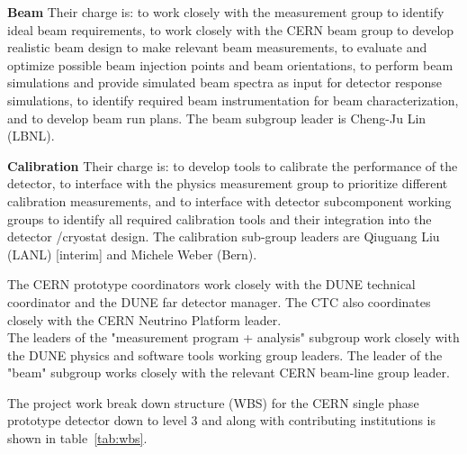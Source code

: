  
{\bf Beam} Their charge is: to work closely with the measurement group to identify ideal beam requirements, to work closely with the CERN beam group to develop realistic beam design to make relevant beam measurements, to evaluate and optimize possible beam injection points and beam orientations, to perform beam simulations and provide simulated beam spectra as input for detector response simulations, to identify required beam instrumentation for beam characterization, and to develop beam run plans.
The  beam subgroup leader is Cheng-Ju Lin (LBNL).


{\bf Calibration}  Their charge is:  to develop tools to calibrate the performance of the detector, to interface with the physics measurement group to prioritize different calibration measurements, and to interface with detector subcomponent working groups to identify all required calibration tools and their integration into the detector /cryostat design.
The calibration sub-group leaders are Qiuguang Liu (LANL) [interim] and Michele Weber (Bern).


The CERN prototype coordinators work closely with the DUNE technical coordinator and the DUNE far detector manager.
The CTC also coordinates closely with the CERN Neutrino Platform leader.\\
The leaders of the "measurement program + analysis" subgroup work closely with the DUNE physics and software tools working group leaders. The leader of the "beam" subgroup works closely with the relevant CERN beam-line group leader.

The project work break down structure (WBS) for the CERN single phase prototype detector down to level 3 and along with contributing institutions is shown in table~\ref{tab:wbs}.


